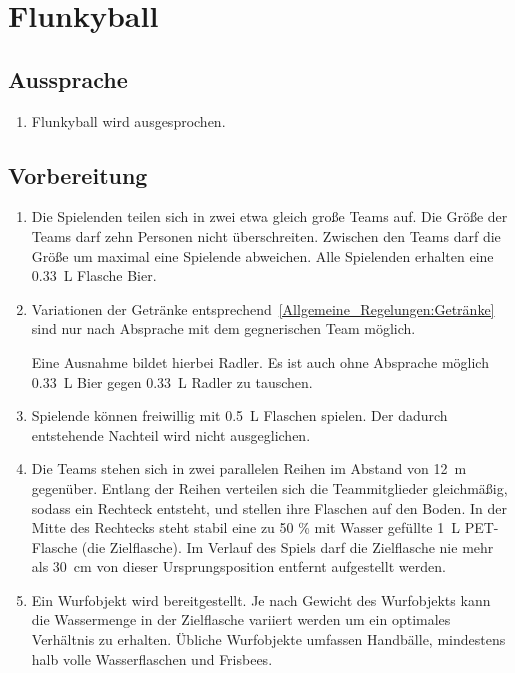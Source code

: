 \chapter{Flunkyball}
\section{Aussprache}
\begin{enumerate}[label={(\arabic*)}]
    \item
    Flunkyball wird  ausgesprochen.
\end{enumerate}

\section{Vorbereitung}
\begin{enumerate}[label={(\arabic*)}]
    \item
    Die Spielenden teilen sich in zwei etwa gleich große Teams auf.
    Die Größe der Teams darf zehn Personen nicht überschreiten.
    Zwischen den Teams darf die Größe um maximal eine Spielende abweichen.
    Alle Spielenden erhalten eine \SI{0,33}{\liter} Flasche Bier.

    \item Variationen der Getränke entsprechend~\ref{Allgemeine_Regelungen:Getränke} sind nur nach Absprache mit dem gegnerischen Team möglich.

    Eine Ausnahme bildet hierbei Radler.
    Es ist auch ohne Absprache möglich \SI{0,33}{\liter} Bier gegen \SI{0,33}{\liter} Radler zu tauschen.

    \item
    Spielende können freiwillig mit \SI{0,5}{\liter} Flaschen spielen.
    Der dadurch entstehende Nachteil wird nicht ausgeglichen.

    \item
    Die Teams stehen sich in zwei parallelen Reihen im Abstand von \SI{12}{\meter} gegenüber.
    Entlang der Reihen verteilen sich die Teammitglieder gleichmäßig, sodass ein Rechteck entsteht, und stellen ihre Flaschen auf den Boden.
    In der Mitte des Rechtecks steht stabil eine zu 50 \% mit Wasser gefüllte \SI{1}{\liter} PET-Flasche (die Zielflasche).
    Im Verlauf des Spiels darf die Zielflasche nie mehr als \SI{30}{\centi\meter} von dieser Ursprungsposition entfernt aufgestellt werden.

    \item
    Ein Wurfobjekt wird bereitgestellt.
    Je nach Gewicht des Wurfobjekts kann die Wassermenge in der Zielflasche variiert werden um ein optimales Verhältnis zu erhalten.
    Übliche Wurfobjekte umfassen Handbälle, mindestens halb volle Wasserflaschen und Frisbees.
\end{enumerate}

